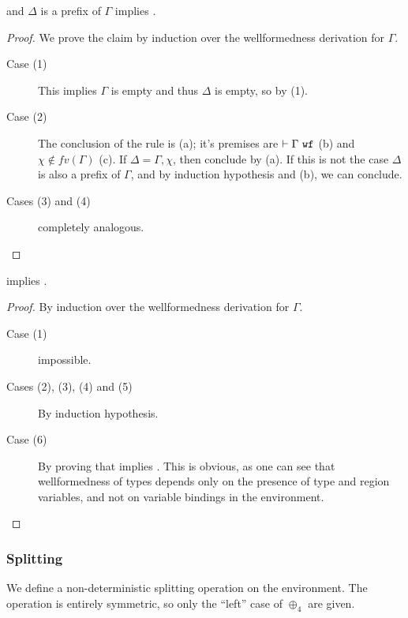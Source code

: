 \documentclass[a4paper]{article}
\begin{document}
\begin{prop}
  \cwf{\Gamma} and $\Delta$ is a prefix of $\Gamma$ implies \cwf{\Delta}.
  \label{prop:cwfprefix}
\end{prop}
\begin{proof}
  We prove the claim by induction over the wellformedness derivation for $\Gamma$. 
\begin{description}
  \item[Case (1)] This implies $\Gamma$ is empty and thus $\Delta$ is empty, so \cwf{\Delta}
    by (1).
  \item[Case (2)] 
    The conclusion of the rule is \cwf{\Gamma,\chi}(a); it's premises are
    ${\normalfont \vdash \Gamma\ \texttt{wf}}$ (b) and $\chi\notin fv(\Gamma)$ (c). If $\Delta = \Gamma,\chi$, then conclude by (a).
    If this is not the case $\Delta$ is also a prefix of $\Gamma$, and by induction
    hypothesis and (b), we can conclude.
  \item[Cases (3) and (4)] completely analogous.
\end{description}
\end{proof}

\begin{prop}
  \label{prop:cwfomit}
   implies \cwf{\Gamma,\Delta}.
\end{prop}
\begin{proof}
  By induction over the wellformedness derivation for $\Gamma$.
  \begin{description}
    \item[Case (1)] impossible.
    \item[Cases (2), (3), (4) and (5)] By induction hypothesis.  
    \item[Case (6)] By proving that  implies
      . This is obvious, as one can see that wellformedness
      of types depends only on the presence of type and region variables, and
      not on variable bindings in the environment.
  \end{description}
  
\end{proof}


\subsubsection*{Splitting}

We define a non-deterministic splitting operation on the environment. The
operation is entirely symmetric, so only the ``left''
case of $\oplus_4$ are given.
\end{document}
